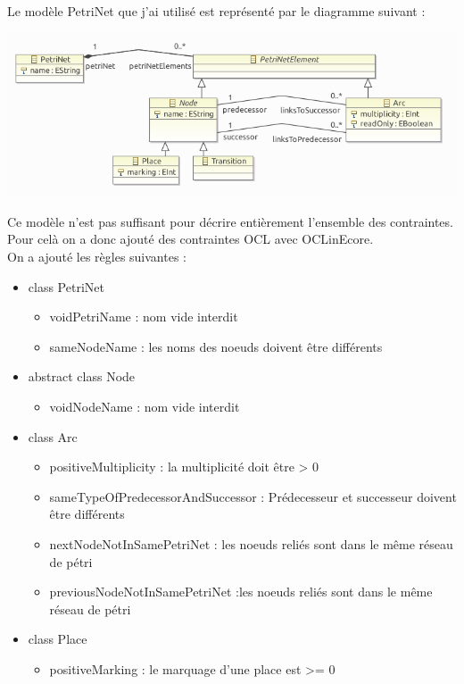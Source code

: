 Le modèle PetriNet que j'ai utilisé est représenté par le diagramme suivant :

\begin{center}
\includegraphics[width=\textwidth]{../Images/meta_petri.png}
\end{center}



Ce modèle n'est pas suffisant pour décrire entièrement l'ensemble des contraintes. Pour celà on a donc ajouté des contraintes OCL avec OCLinEcore.\\

On a ajouté les règles suivantes :
\begin{itemize}
\item class PetriNet
\begin{itemize}

\item voidPetriName : nom vide interdit
\item sameNodeName : les noms des noeuds doivent être différents
\end{itemize}

\item abstract class Node
\begin{itemize}
\item voidNodeName : nom vide interdit
\end{itemize}

\item class Arc
\begin{itemize}
\item positiveMultiplicity : la multiplicité doit être > 0
\item sameTypeOfPredecessorAndSuccessor : Prédecesseur et successeur doivent être différents
\item nextNodeNotInSamePetriNet : les noeuds reliés sont dans le même réseau de pétri
\item previousNodeNotInSamePetriNet :les noeuds reliés sont dans le même réseau de pétri
\end{itemize}

\item class Place
\begin{itemize}
\item positiveMarking : le marquage d'une place est >= 0
\end{itemize}
\end{itemize}

